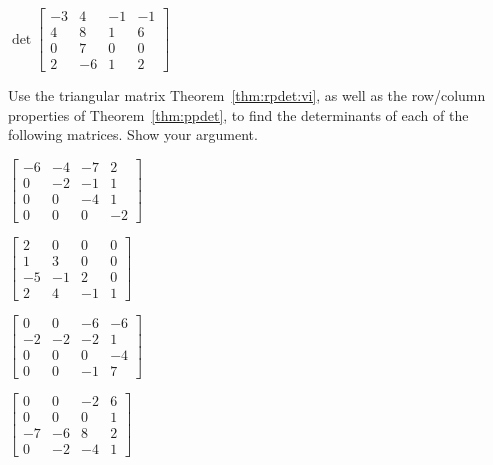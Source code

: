 \begin{exercise}
\begin{parts}
\item \(\det\begin{bmatrix} -3 & 4 & -1 & -1
\\4 & 8 & 1 & 6
\\0 & 7 & 0 & 0
\\2 & -6 & 1 & 2 \end{bmatrix}\)

\end{parts}
\end{exercise}




\begin{exercise} \label{ex:} 
Use the triangular matrix Theorem~\ref{thm:rpdet:vi}, as well as the row\slash column properties of Theorem~\ref{thm:ppdet}, to find the determinants of each of the following matrices.
Show your argument.
\begin{parts}
\item \(\begin{bmatrix} -6 & -4 & -7 & 2
\\0 & -2 & -1 & 1
\\0 & 0 & -4 & 1
\\0 & 0 & 0 & -2 \end{bmatrix}\)

\item \(\begin{bmatrix} 2 & 0 & 0 & 0
\\1 & 3 & 0 & 0
\\-5 & -1 & 2 & 0
\\2 & 4 & -1 & 1 \end{bmatrix}\)

\item \(\begin{bmatrix} 0 & 0 & -6 & -6
\\-2 & -2 & -2 & 1
\\0 & 0 & 0 & -4
\\0 & 0 & -1 & 7 \end{bmatrix}\)

\item \(\begin{bmatrix} 0 & 0 & -2 & 6
\\0 & 0 & 0 & 1
\\-7 & -6 & 8 & 2
\\0 & -2 & -4 & 1 \end{bmatrix}\)


\end{parts}
\end{exercise}
